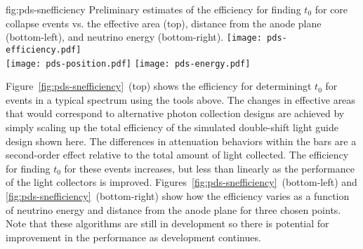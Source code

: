 \begin{dunefigure}{fig:pds-snefficiency}
{Preliminary estimates of the efficiency for finding $t_0$ for core collapse  events vs. the effective area (top), distance from the anode plane (bottom-left), and neutrino energy (bottom-right).}
  \texttt{[image: pds-efficiency.pdf]}\\
  \texttt{[image: pds-position.pdf]}
  \texttt{[image: pds-energy.pdf]}
\end{dunefigure}


Figure~\ref{fig:pds-snefficiency}~(top) shows the efficiency for determiningt $t_0$ for events in a typical  spectrum using the tools above. The changes in effective areas that would correspond to alternative photon collection designs are achieved by simply scaling up the total efficiency of the simulated double-shift light guide design shown here. The differences in attenuation behaviors within the bars are a second-order effect relative to the total amount of light collected. The efficiency for finding $t_0$ for these events increases, but less than linearly as the performance of the light collectors is improved. Figures~\ref{fig:pds-snefficiency}~(bottom-left) and \ref{fig:pds-snefficiency}~(bottom-right) show how the efficiency varies as a function of neutrino energy and distance from the anode plane for three chosen points. Note that these algorithms are still in development so there is potential for improvement in the performance as development continues.

